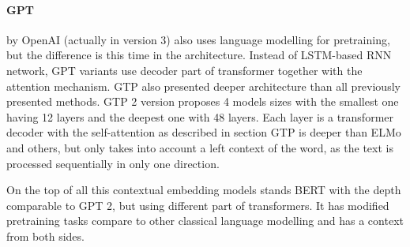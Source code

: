 \paragraph{GPT} by OpenAI (actually in version 3) also uses language modelling for pretraining, but the difference is this time in the architecture. Instead of LSTM-based RNN network, GPT variants use decoder part of transformer together with the attention mechanism. GTP also presented deeper architecture than all previously presented methods. GTP 2 version proposes 4 models sizes with the smallest one having 12 layers and the deepest one with 48 layers. Each layer is a transformer decoder with the self-attention as described in section %
GTP is deeper than ELMo and others, but only takes into account a left context of the word, as the text is processed sequentially in only one direction.
\par
On the top of all this contextual embedding models stands BERT with the depth comparable to GPT 2, but using different part of transformers. It has modified pretraining tasks compare to other classical language modelling and has a context from both sides. %

